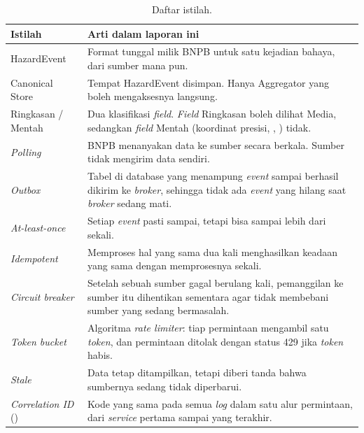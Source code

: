 \begin{table}[H]
\centering
\small
\begin{tabularx}{\textwidth}{@{}L{3.4cm}Y@{}}
\toprule
\textbf{Istilah} & \textbf{Arti dalam laporan ini}\\
\midrule
HazardEvent & Format tunggal milik BNPB untuk satu kejadian bahaya, dari sumber mana pun.\\
Canonical Store & Tempat HazardEvent disimpan. Hanya Aggregator yang boleh mengaksesnya langsung.\\
Ringkasan / Mentah & Dua klasifikasi \emph{field}. \emph{Field} Ringkasan boleh dilihat Media, sedangkan \emph{field} Mentah (koordinat presisi, , ) tidak.\\
\emph{Polling} & BNPB menanyakan data ke sumber secara berkala. Sumber tidak mengirim data sendiri.\\
\emph{Outbox} & Tabel di database yang menampung \emph{event} sampai berhasil dikirim ke \emph{broker}, sehingga tidak ada \emph{event} yang hilang saat \emph{broker} sedang mati.\\
\emph{At-least-once} & Setiap \emph{event} pasti sampai, tetapi bisa sampai lebih dari sekali.\\
\emph{Idempotent} & Memproses hal yang sama dua kali menghasilkan keadaan yang sama dengan memprosesnya sekali.\\
\emph{Circuit breaker} & Setelah sebuah sumber gagal berulang kali, pemanggilan ke sumber itu dihentikan sementara agar tidak membebani sumber yang sedang bermasalah.\\
\emph{Token bucket} & Algoritma \emph{rate limiter}: tiap permintaan mengambil satu \emph{token}, dan permintaan ditolak dengan status 429 jika \emph{token} habis.\\
\emph{Stale} & Data tetap ditampilkan, tetapi diberi tanda bahwa sumbernya sedang tidak diperbarui.\\
\emph{Correlation ID} () & Kode yang sama pada semua \emph{log} dalam satu alur permintaan, dari \emph{service} pertama sampai yang terakhir.\\
\bottomrule
\end{tabularx}
\caption{Daftar istilah.}
\end{table}
